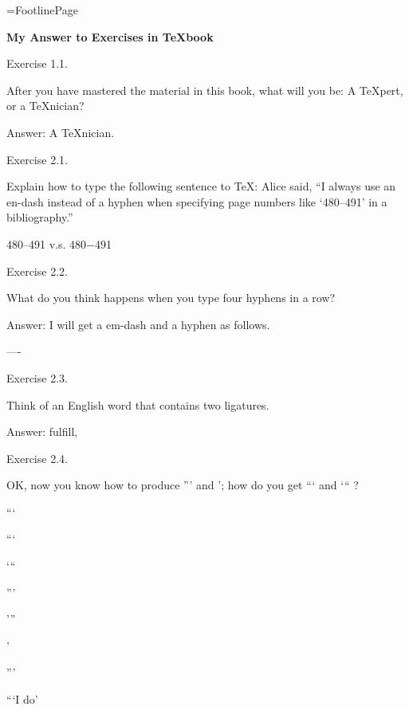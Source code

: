 \hsize=29pc %
\vsize=42pc %
\footline={\tenrm Footline\quad\dotfill\quad Page \folio}

\topglue 1in %
\centerline{\bf My Answer to Exercises in \TeX book}
\smallskip %





\beginsection Exercise 1.1.\par
After you have mastered the material in this book, what will you be: A \TeX pert,
or a \TeX nician?

Answer: A \TeX nician.

\beginsection Exercise 2.1.\par
Explain how to type the following sentence to \TeX: Alice said, ``I always use an
en-dash instead of a hyphen when specifying page numbers like `480--491' in a
bibliography.''

480--491 v.s. 480$-$491

\beginsection Exercise 2.2.\par
What do you think happens when you type four hyphens in a row?

Answer: I will get a em-dash and a hyphen as follows.\par
----

\beginsection Exercise 2.3.\par
Think of an English word that contains two ligatures.\par
Answer: fulfill, 

\beginsection Exercise 2.4.\par
OK, now you know how to produce {''}' and '; how do you get {``}\thinspace` and `{``} ?\par
```\par
{``}`\par
`{``}\par
'''\par
'{''}\par
'\par
{''}'\par
{``}\thinspace`I do'\par

